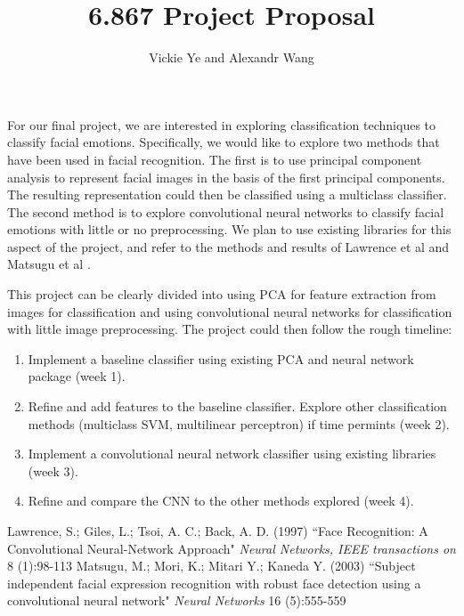 \documentclass[11pt, twoside]{article}
\title{6.867 Project Proposal}
\date{}
\author {Vickie Ye and Alexandr Wang}
\begin{document}
\maketitle

For our final project, we are interested in exploring classification
techniques to classify facial emotions. Specifically, we would like
to explore two methods that have been used in facial recognition.
The first is to use principal component analysis to represent facial
images in the basis of the first principal components. The resulting
representation could then be classified using a multiclass classifier.
The second method is to explore convolutional neural networks to classify
facial emotions with little or no preprocessing. We plan to use existing
libraries for this aspect of the project, and refer to the methods and
results of Lawrence et al \cite{Lawrence} and Matsugu et al \cite{Matsugu}.

This project can be clearly divided into using PCA for feature
extraction from images for classification and using convolutional
neural networks for classification with little image preprocessing.
The project could then follow the rough timeline:
\begin{enumerate}
\item Implement a baseline classifier using existing PCA and neural network
package (week 1).
\item Refine and add features to the baseline classifier. Explore other
classification methods (multiclass SVM, multilinear perceptron) if
time permints (week 2).
\item Implement a convolutional neural network classifier using existing
libraries (week 3).
\item Refine and compare the CNN to the other methods explored (week 4).
\end{enumerate}

\begin{thebibliography}{9}
Lawrence, S.; Giles, L.; Tsoi, A. C.; Back, A. D. (1997)
``Face Recognition: A Convolutional Neural-Network Approach"
\textit{Neural Networks, IEEE transactions on} 8 (1):98-113
Matsugu, M.; Mori, K.; Mitari Y.; Kaneda Y. (2003)
``Subject independent facial expression recognition with robust face detection using a convolutional neural network"
\textit{Neural Networks} 16 (5):555-559
\end{thebibliography}
\end{document}
